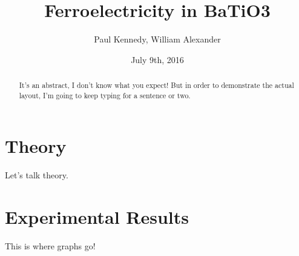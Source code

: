 \documentclass[12pt]{article}
\title{Ferroelectricity in BaTiO3}
\author{Paul Kennedy, William Alexander}
\date{July 9th, 2016}
\begin{document}
	
\maketitle

\begin{abstract}

It's an abstract, I don't know what you expect! But in order to demonstrate the actual layout, I'm going to keep typing for a sentence or two. 

\end{abstract}

\section{Theory}

Let's talk theory.

\section{Experimental Results}

This is where graphs go!
\end{document}
